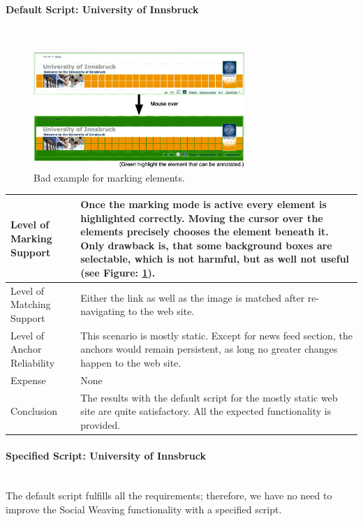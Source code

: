 \paragraph{Default Script: University of Innsbruck}\mbox{}\\
\begin{figure}\centering
		\includegraphics[width=8cm]{images/bad-example-backgroundbox.png}
		\caption{Bad example for marking elements.}
		\label{bad-example-backgroundbox}
\end{figure} 
\begin{tabular}{|p{}| p{} |}
\hline 
Level of Marking Support & Once the marking mode is active every element is highlighted correctly. Moving the cursor over the elements precisely chooses the element beneath it. Only drawback is, that some background boxes are selectable, which is not harmful, but as well not useful (see Figure: \ref{bad-example-backgroundbox}).\\ 
\hline 
Level of Matching Support & Either the link as well as the image is matched after re-navigating to the web site. \\ 
\hline 
Level of Anchor Reliability & This scenario is mostly static. Except for news feed section, the anchors would remain persistent, as long no greater changes happen to the web site. \\ 
\hline 
Expense & None \\ 
\hline 
Conclusion & The results with the default script for the mostly static web site are quite satisfactory. All the expected functionality is provided. \\ 
\hline 
\end{tabular} 
\paragraph{Specified Script: University of Innsbruck}\mbox{}\\
The default script fulfills all the requirements; therefore, we have no need to improve the Social Weaving functionality with a specified script. 

